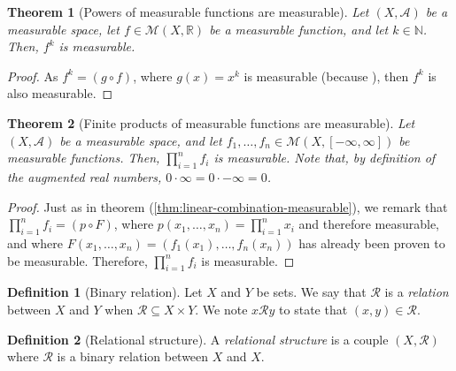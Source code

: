 \documentclass{article}
\newtheorem{theorem}{Theorem}[section]
\theoremstyle{definition}
\newtheorem{definition}{Definition}[section]
\theoremstyle{remark}
\theoremstyle{example}
\theoremstyle{notation}
\theoremstyle{axiom}
\begin{document}
\begin{theorem}[Powers of measurable functions are measurable] \label{thm:power-measurable-is-measurable}
		Let $(X, \mathcal{A})$ be a measurable space, let $f \in \mathcal{M}(X, \mathbb{R})$ be a measurable function, and let $k \in \mathbb{N}$. Then, $f^k$ is measurable.
\end{theorem}

\begin{proof}
		As $f^k = (g \circ f)$, where $g(x) = x^k$ is measurable (because ), then $f^k$ is also measurable.
\end{proof}

\begin{theorem}[Finite products of measurable functions are measurable] \label{thm:product-measurable-functions}
		Let $(X, \mathcal{A})$ be a measurable space, and let $f_1, \dots, f_n \in \mathcal{M}(X, [-\infty, \infty])$ be measurable functions. Then, $\prod_{i=1}^n f_i$ is measurable. Note that, by definition of the augmented real numbers, $0 \cdot \infty = 0 \cdot -\infty = 0$.
\end{theorem}

\begin{proof}
		Just as in theorem (\ref{thm:linear-combination-measurable}), we remark that $\prod_{i=1}^n f_i = (p \circ F)$, where $p(x_1, \dots, x_n) = \prod_{i=1}^n x_i$  and therefore measurable, and where $F(x_1, \dots, x_n) = (f_1(x_1), \dots, f_n(x_n))$ has already been proven to be measurable. Therefore, $\prod_{i=1}^n f_i$ is measurable.
\end{proof}


\begin{definition}[Binary relation]
		Let $X$ and $Y$ be sets. We say that $\mathcal{R}$ is a \textit{relation} between $X$ and $Y$ when $\mathcal{R} \subseteq X \times Y$. We note $x \mathcal{R} y$ to state that $(x, y) \in \mathcal{R}$.
\end{definition}

\begin{definition}[Relational structure] %
		A \textit{relational structure} is a couple $(X, \mathcal{R})$ where $\mathcal{R}$ is a binary relation between $X$ and $X$.
\end{definition}
\end{document}
